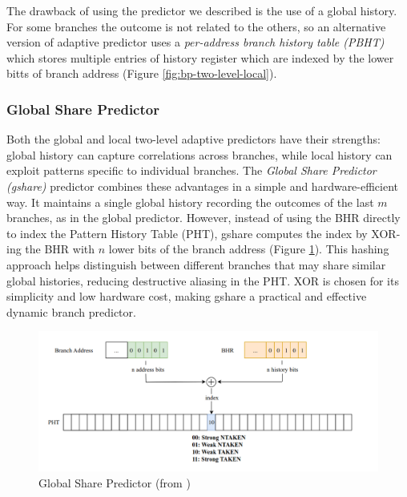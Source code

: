 The drawback of using the predictor we described is the use of a global history. For some branches the outcome is not related to the others, so an alternative version of adaptive predictor uses a \textit{per-address branch history table (PBHT)} which stores multiple entries of history register which are indexed by the lower bitts of branch address (Figure \ref{fig:bp-two-level-local}).



\subsubsection{Global Share Predictor}

Both the global and local two-level adaptive predictors have their strengths: global history can capture correlations across branches, while local history can exploit patterns specific to individual branches. The \textit{Global Share Predictor (gshare)} predictor combines these advantages in a simple and hardware-efficient way. It maintains a single global history recording the outcomes of the last $m$ branches, as in the global predictor. However, instead of using the BHR directly to index the Pattern History Table (PHT), gshare computes the index by XOR-ing the BHR with $n$ lower bits of the branch address (Figure \ref{fig:bp-gshare}). This hashing approach helps distinguish between different branches that may share similar global histories, reducing destructive aliasing in the PHT. XOR is chosen for its simplicity and low hardware cost, making gshare a practical and effective dynamic branch predictor.

\begin{figure}
    \includegraphics[width=\textwidth]{figures/bp-gshare.png}
    \caption{Global Share Predictor (from \cite{mahling_reverse_2023})}
    \label{fig:bp-gshare}
\end{figure}



